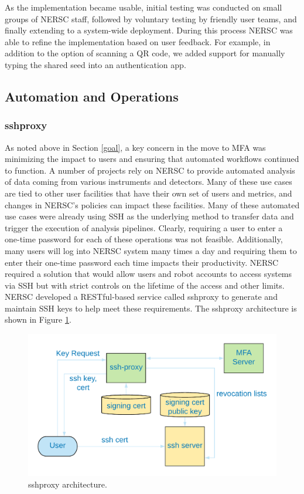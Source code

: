 \documentclass[sigconf,review]{acmart}
\begin{document}
As the implementation became usable, initial testing was conducted on small
groups of NERSC staff, followed by voluntary testing by friendly user teams, and
finally extending to a system-wide deployment. During this process NERSC was
able to refine the implementation based on user feedback. For example, in
addition to the option of scanning a QR code, we added support for manually
typing the shared seed into an authentication app.

\subsection{Automation and Operations}
\label{auto}

\subsubsection{sshproxy}
\label{proxy}

As noted above in Section \ref{goal}, a key concern in the move to MFA was
minimizing the impact to users and ensuring that automated workflows continued
to function. A number of projects rely on NERSC to provide automated analysis of
data coming from various instruments and detectors.  Many of these use cases are
tied to other user facilities that have their own set of users and metrics, and
changes in NERSC's policies can impact these facilities.  Many of these
automated use cases were already using SSH as the underlying method to transfer
data and trigger the execution of analysis pipelines.  Clearly, requiring a user
to enter a one-time password for each of these operations was not feasible.
Additionally, many users will log into NERSC system many times a day and
requiring them to enter their one-time password each time impacts their
productivity.  NERSC required a solution that would allow users and robot
accounts to access systems via SSH but with strict controls on the lifetime of
the access and other limits.  NERSC developed a RESTful-based service called
sshproxy to generate and maintain SSH keys to help meet these requirements. The
sshproxy architecture is shown in Figure \ref{sshproxy-diagram}.

\begin{figure}[h!]
  \centering
  \includegraphics[width=\columnwidth]{sshproxy.png}
  \caption{sshproxy architecture.}
  \label{sshproxy-diagram}
\end{figure}
\end{document}
